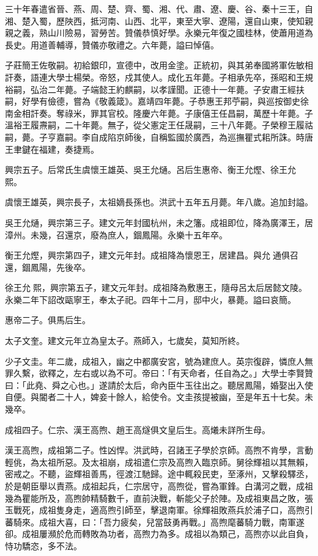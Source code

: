 三十年春遣省晉、燕、周、楚、齊、蜀、湘、代、肅、遼、慶、谷、秦十三王，自湘、楚入蜀，歷陜西，抵河南、山西、北平，東至大寧、遼陽，還自山東，使知親親之義，熟山川險易，習勞苦。贊儀恭慎好學。永樂元年復之國桂林，使蕭用道為長史。用道善輔導，贊儀亦敬禮之。六年薨，謚曰悼僖。

子莊簡王佐敬嗣。初給銀印，宣德中，改用金塗。正統初，與其弟奉國將軍佐敏相訐奏，語連大學士楊榮。帝怒，戍其使人。成化五年薨。子相承先卒，孫昭和王規裕嗣，弘治二年薨。子端懿王約麒嗣，以孝謹聞。正德十一年薨。子安肅王經扶嗣，好學有儉德，嘗為《敬義箴》。嘉靖四年薨。子恭惠王邦苧嗣，與巡按御史徐南金相訐奏。奪祿米，罪其官校。隆慶六年薨。子康僖王任昌嗣，萬歷十年薨。子溫裕王履燾嗣，二十年薨。無子，從父憲定王任晟嗣，三十八年薨。子榮穆王履祜嗣，薨。子亨嘉嗣。李自成陷京師後，自稱監國於廣西，為巡撫瞿式耜所誅。時唐王聿鍵在福建，奏捷焉。

興宗五子。后常氏生虞懷王雄英、吳王允熥。呂后生惠帝、衡王允熞、徐王允熙。

虞懷王雄英，興宗長子，太祖嫡長孫也。洪武十五年五月薨。年八歲。追加封謚。

吳王允熥，興宗第三子。建文元年封國杭州，未之籓。成祖即位，降為廣澤王，居漳州。未幾，召還京，廢為庶人，錮鳳陽。永樂十五年卒。

衡王允熞，興宗第四子，建文元年封。成祖降為懷恩王，居建昌。與允通俱召還，錮鳳陽，先後卒。

徐王允熙，興宗第五子，建文元年封。成祖降為敷惠王，隨母呂太后居懿文陵。永樂二年下詔改甌寧王，奉太子祀。四年十二月，邸中火，暴薨。謚曰哀簡。

惠帝二子。俱馬后生。

太子文奎。建文元年立為皇太子。燕師入，七歲矣，莫知所終。

少子文圭。年二歲，成祖入，幽之中都廣安宮，號為建庶人。英宗復辟，憐庶人無罪久繫，欲釋之，左右或以為不可。帝曰：「有天命者，任自為之。」大學士李賢贊曰：「此堯、舜之心也。」遂請於太后，命內臣牛玉往出之。聽居鳳陽，婚娶出入使自便。與閽者二十人，婢妾十餘人，給使令。文圭孩提被幽，至是年五十七矣。未幾卒。

成祖四子。仁宗、漢王高煦、趙王高燧俱文皇后生。高爔未詳所生母。

漢王高煦，成祖第二子。性凶悍。洪武時，召諸王子學於京師。高煦不肯學，言動輕佻，為太祖所惡。及太祖崩，成祖遣仁宗及高煦入臨京師。舅徐輝祖以其無賴，密戒之。不聽，盜輝祖善馬，徑渡江馳歸。途中輒殺民吏，至涿州，又擊殺驛丞，於是朝臣舉以責燕。成祖起兵，仁宗居守，高煦從，嘗為軍鋒。白溝河之戰，成祖幾為瞿能所及，高煦帥精騎數千，直前決戰，斬能父子於陣。及成祖東昌之敗，張玉戰死，成祖隻身走，適高煦引師至，擊退南軍。徐輝祖敗燕兵於浦子口，高煦引蕃騎來。成祖大喜，曰：「吾力疲矣，兒當鼓勇再戰。」高煦麾蕃騎力戰，南軍遂卻。成祖屢瀕於危而轉敗為功者，高煦力為多。成祖以為類己，高煦亦以此自負，恃功驕恣，多不法。

